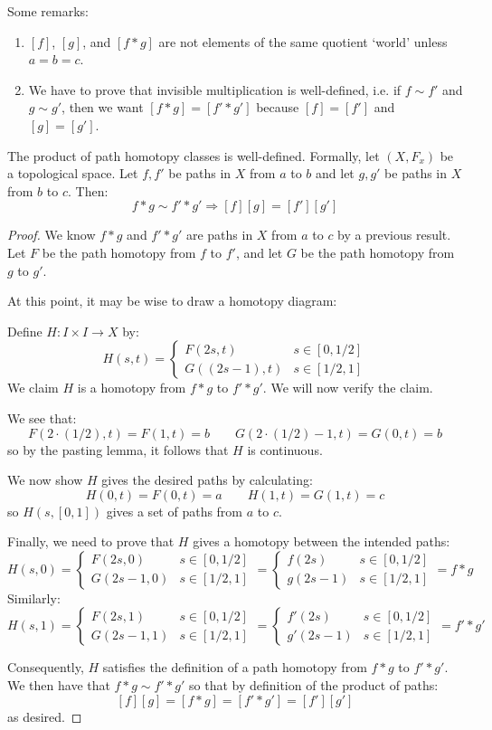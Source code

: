 Some remarks: 
\begin{enumerate}
	\item $[f]$, $[g]$, and $[f \ast g]$ are not elements of the same quotient `world' unless $a = b = c$. 
	\item We have to prove that invisible multiplication is well-defined, i.e. if $f \sim f'$ and $g \sim g'$, then we want $[f \ast g] = [f' \ast g']$ because $[f] = [f']$ and $[g] = [g']$. 
\end{enumerate}
\begin{lemma}
	[Important] The product of path homotopy classes is well-defined. Formally, let $(X,F_x)$ be a topological space. Let $f,f'$ be paths in $X$ from $a$ to $b$ and let $g,g'$ be paths in $X$ from $b$ to $c$. Then:
	\[f*g \sim f'*g' \Rightarrow [f][g] = [f'][g']\]
\end{lemma}
\begin{proof}
	We know $f*g$ and $f'*g'$ are paths in $X$ from $a$ to $c$ by a previous result. Let $F$ be the path homotopy from $f$ to $f'$, and let $G$ be the path homotopy from $g$ to $g'$.
	
	At this point, it may be wise to draw a homotopy diagram: \placeholder
	
	Define $H:I\times I\to X$ by:
	\[H(s,t) = 
	\begin{cases}
		F(2s,t) & s\in [0,1/2] \\
		G((2s-1),t) & s\in [1/2,1] 
	\end{cases}
	\]
	We claim $H$ is a homotopy from $f*g$ to $f'*g'$. We will now verify the claim. 
	
	We see that:
	\[F(2\cdot(1/2),t) = F(1,t) = b \qquad G(2\cdot(1/2) -1,t) = G(0,t) = b\]
	so by the pasting lemma, it follows that $H$ is continuous.
	
	We now show $H$ gives the desired paths by calculating:
	\[H(0,t) = F(0,t) = a \qquad H(1,t) = G(1,t) = c\]
	so $H(s,[0,1])$ gives a set of paths from $a$ to $c$. 
	
	Finally, we need to prove that $H$ gives a homotopy between the intended paths:
	\[H(s,0) = 
	\begin{cases}
		F(2s,0) & s\in [0,1/2] \\
		G(2s-1,0) & s\in [1/2,1] 
	\end{cases}
	= 
	\begin{cases}
		f(2s) & s\in [0,1/2] \\
		g(2s-1) & s\in [1/2,1] 
	\end{cases}
	= f*g \]
	Similarly:
	\[H(s,1) = 
	\begin{cases}
		F(2s,1) & s\in [0,1/2] \\
		G(2s-1,1) & s\in [1/2,1] 
	\end{cases}
	= 
	\begin{cases}
		f'(2s) & s\in [0,1/2] \\
		g'(2s-1) & s\in [1/2,1] 
	\end{cases}
	= f'*g' \]
	
	Consequently, $H$ satisfies the definition of a path homotopy from $f*g$ to $f'*g'$. We then have that $f*g\sim f'*g'$ so that by definition of the product of paths:
	\[[f][g] = [f*g] = [f'*g'] = [f'][g']\]
	as desired. 
\end{proof}
